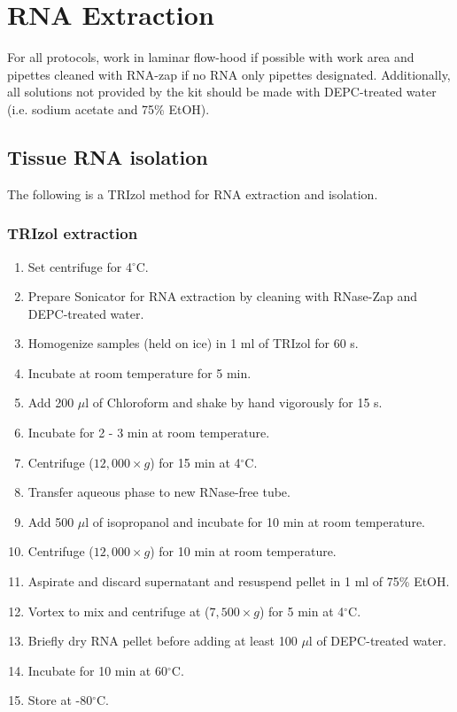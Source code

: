 \pagebreak

\section{RNA Extraction}

\noindent For all protocols, work in laminar flow-hood if possible with work area and pipettes cleaned with RNA-zap if no RNA only pipettes designated. Additionally, all solutions not provided by the kit should be made with DEPC-treated water (i.e. sodium acetate and 75\% EtOH).

\subsection{Tissue RNA isolation}

\noindent The following is a TRIzol method for RNA extraction and isolation.

\subsubsection*{TRIzol extraction}
\begin{enumerate}
\item Set centrifuge for 4$^{\circ}$C.
\item Prepare Sonicator for RNA extraction by cleaning with RNase-Zap and DEPC-treated water.
\item Homogenize samples (held on ice) in 1 ml of TRIzol for 60 s\footnotemark.
\item Incubate at room temperature for 5 min.
\item Add 200 $\mu$l of Chloroform and shake by hand vigorously for 15 s.
\item Incubate for 2 - 3 min at room temperature.
\item Centrifuge ($12,000 \times g$) for 15 min at 4$^{\circ}$C\footnotemark.
\item Transfer aqueous phase to new RNase-free tube.
\item Add 500 $\mu$l of isopropanol and incubate for 10 min at room temperature.
\item Centrifuge ($12,000 \times g$) for 10 min at room temperature.
\item Aspirate and discard supernatant and resuspend pellet in 1 ml of 75\% EtOH.
\item Vortex to mix and centrifuge at ($7,500 \times g$) for 5 min at 4$^{\circ}$C.
\item Briefly dry RNA pellet before adding at least 100 $\mu$l of DEPC-treated water.
\item Incubate for 10 min at 60$^{\circ}$C.
\item Store at -80$^{\circ}$C.
\end{enumerate}

